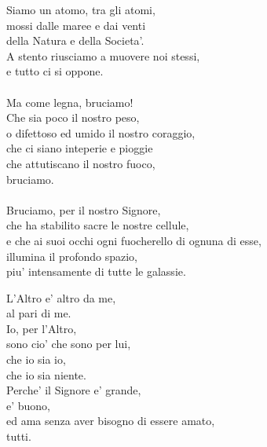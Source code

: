 \begin{haiku}
    Siamo un atomo, tra gli atomi,\\
    mossi dalle maree e dai venti \\
    della Natura e della Societa'.\\
    A stento riusciamo a muovere noi stessi,\\
    e tutto ci si oppone.\\
    \leavevmode\\
    Ma come legna, bruciamo!\\
    Che sia poco il nostro peso,\\
    o difettoso ed umido il nostro coraggio,\\
    che ci siano inteperie e pioggie\\
    che attutiscano il nostro fuoco,\\
    bruciamo.\\
    \leavevmode\\
    Bruciamo, per il nostro Signore,\\
    che ha stabilito sacre le nostre cellule,\\
    e che ai suoi occhi ogni fuocherello di ognuna di esse,\\
    illumina il profondo spazio,\\
    piu' intensamente di tutte le galassie.\\
\end{haiku}

\begin{haiku}
    L'Altro e' altro da me,\\
    al pari di me.\\
    Io, per l'Altro,\\
    sono cio' che sono per lui,\\
    che io sia io,\\
    che io sia niente.\\
    Perche' il Signore e' grande,\\
    e' buono,\\
    ed ama senza aver bisogno di essere amato,\\
    tutti.\\
\end{haiku}

